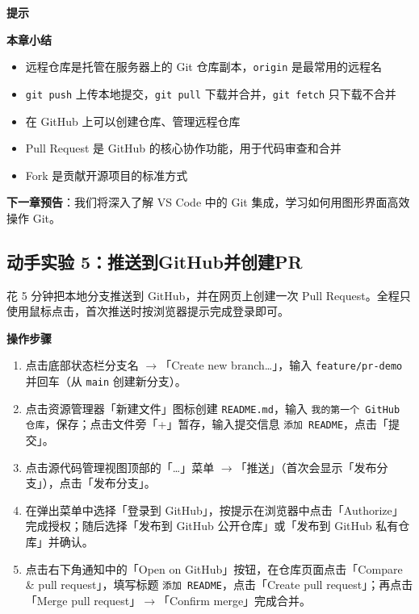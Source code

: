 \documentclass[12pt,a4paper,openany]{ctexbook}
\newenvironment{tipbox}{%
  \medskip
  \noindent\textbf{\faLightbulb\; 提示}
  \smallskip
}{%
  \medskip
}
\newenvironment{stepbox}{%
  \medskip
  \noindent\textbf{\faCogs\; 操作步骤}
  \smallskip
}{%
  \medskip
}
\begin{document}
\begin{tipbox}
\textbf{本章小结}
\begin{itemize}
  \item 远程仓库是托管在服务器上的 Git 仓库副本，\texttt{origin} 是最常用的远程名
  \item \texttt{git push} 上传本地提交，\texttt{git pull} 下载并合并，\texttt{git fetch} 只下载不合并
  \item 在 GitHub 上可以创建仓库、管理远程仓库
  \item Pull Request 是 GitHub 的核心协作功能，用于代码审查和合并
  \item Fork 是贡献开源项目的标准方式
\end{itemize}

\textbf{下一章预告}：我们将深入了解 VS Code 中的 Git 集成，学习如何用图形界面高效操作 Git。
\end{tipbox}

\subsection*{动手实验 5：推送到GitHub并创建PR}

花 5 分钟把本地分支推送到 GitHub，并在网页上创建一次 Pull Request。全程只使用鼠标点击，首次推送时按浏览器提示完成登录即可。

\begin{stepbox}
\begin{enumerate}[leftmargin=1.5em]
  \item 点击底部状态栏分支名 $\to$「Create new branch…」，输入 \texttt{feature/pr-demo} 并回车（从 \texttt{main} 创建新分支）。
  \item 点击资源管理器「新建文件」图标创建 \texttt{README.md}，输入 \texttt{我的第一个 GitHub 仓库}，保存；点击文件旁「+」暂存，输入提交信息 \texttt{添加 README}，点击「提交」。
  \item 点击源代码管理视图顶部的「…」菜单 $\to$「推送」（首次会显示「发布分支」），点击「发布分支」。
  \item 在弹出菜单中选择「登录到 GitHub」，按提示在浏览器中点击「Authorize」完成授权；随后选择「发布到 GitHub 公开仓库」或「发布到 GitHub 私有仓库」并确认。
  \item 点击右下角通知中的「Open on GitHub」按钮，在仓库页面点击「Compare \& pull request」，填写标题 \texttt{添加 README}，点击「Create pull request」；再点击「Merge pull request」$\to$「Confirm merge」完成合并。
\end{enumerate}
\end{stepbox}
\end{document}
